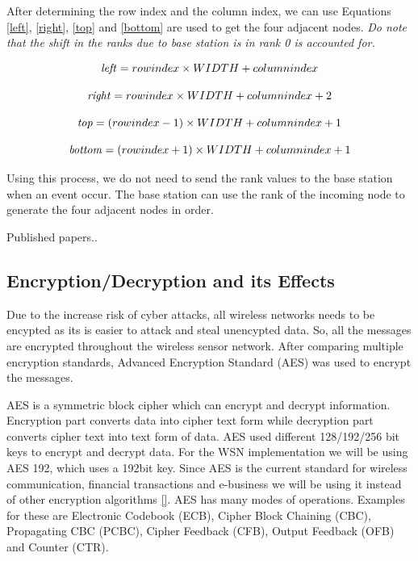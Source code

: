 \documentclass[conference]{IEEEtran}
\begin{document}
	After determining the row index and the column index, we can use Equations \ref{left}, \ref{right}, \ref{top} and \ref{bottom} are used to get the four adjacent nodes. \emph{Do note that the shift in the ranks due to base station is in rank 0 is accounted for.}
	
	
	\begin{equation}
	\text{\emph{left}} = row index \times WIDTH + column index
	\label{left}
	\end{equation}
	
	
	\begin{equation}
	\text{\emph{right}} = row index\times WIDTH + column index + 2
	\label{right}
	\end{equation}
	
		\begin{equation}
	\text{\emph{top}} = (row index - 1) \times WIDTH + column index + 1
	\label{top}
	\end{equation}
	
	
	\begin{equation}
	\text{\emph{bottom}} = (row index + 1) \times WIDTH + column index + 1
	\label{bottom}
	\end{equation}
	
	
	Using this process, we do not need to send the rank values to the base station when an event occur. The base station can use the rank of the incoming node to generate the four adjacent nodes in order. 
	

	Published papers..
	
	
	
	
	\subsection{ Encryption/Decryption and its Effects }\label{encryption}
	
	Due to the increase risk of cyber attacks, all wireless networks needs to be encypted as its is easier to attack and steal unencypted data. So, all the messages are encrypted throughout the wireless sensor network. After comparing multiple encryption standards, Advanced Encryption Standard (AES) was used to encrypt the messages.
	
	AES is a symmetric block cipher which can encrypt and decrypt information. Encryption part converts data into cipher text form while decryption part converts cipher text into text form of data.  AES used different 128/192/256 bit keys to encrypt and decrypt data. For the WSN implementation we will be using AES 192, which uses a 192bit key. Since AES is the current standard for wireless communication, financial transactions and e-business we will be using it instead of other encryption algorithms \ref{}. AES has many modes of operations. Examples for these are Electronic Codebook (ECB), Cipher Block Chaining (CBC), Propagating CBC (PCBC), Cipher Feedback (CFB), Output Feedback (OFB) and Counter (CTR).
	
\end{document}
